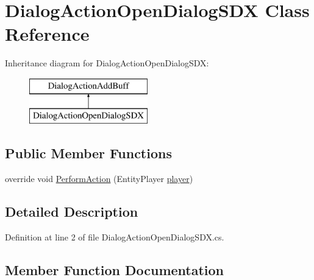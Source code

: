 \hypertarget{class_dialog_action_open_dialog_s_d_x}{}\section{Dialog\+Action\+Open\+Dialog\+S\+DX Class Reference}
\label{class_dialog_action_open_dialog_s_d_x}
Inheritance diagram for Dialog\+Action\+Open\+Dialog\+S\+DX\+:\begin{figure}[H]
\begin{center}
\leavevmode
\includegraphics[height=2.000000cm]{dc/da7/class_dialog_action_open_dialog_s_d_x}
\end{center}
\end{figure}
\subsection*{Public Member Functions}
\begin{DoxyCompactItemize}
\item 
override void \mbox{\hyperlink{class_dialog_action_open_dialog_s_d_x_a41454fe01c90cff4a125e05b90801566}{Perform\+Action}} (Entity\+Player \mbox{\hyperlink{_sphere_i_i_01_music_01_boxes_2_config_2_localization_8txt_a4e2cb8aeff651600ea1cc57fe5a929a4}{player}})
\end{DoxyCompactItemize}


\subsection{Detailed Description}


Definition at line 2 of file Dialog\+Action\+Open\+Dialog\+S\+D\+X.\+cs.



\subsection{Member Function Documentation}
\mbox{\label{class_dialog_action_open_dialog_s_d_x_a41454fe01c90cff4a125e05b90801566}} 
